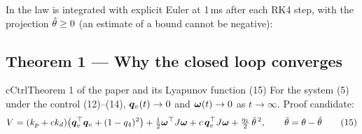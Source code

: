 \begin{projbox}
In  the law is integrated with explicit Euler at 1\,ms after each RK4 step, with the
projection $\hat{\theta}\ge0$ (an estimate of a bound cannot be negative):
\end{projbox}

\subsection{Theorem 1 --- Why the closed loop converges}
\label{sec:theorem}

\begin{eqbox}{cCtrl}{Theorem 1 of the paper and its Lyapunov function (15)}
For the system (5) under the control (12)--(14), $\bm{q}_v(t)\to0$ and $\bm{\omega}(t)\to0$ as $t\to\infty$. Proof candidate:
\begin{equation}
V=(k_p+ck_d)\big(\bm{q}_v^\top\bm{q}_v+(1-q_4)^2\big)+\tfrac12\bm{\omega}^\top J\bm{\omega}+c\,\bm{q}_v^\top J\bm{\omega}+\tfrac{\eta_1}{2}\,\tilde{\theta}^{\,2},
\qquad \tilde{\theta}=\theta-\hat{\theta} \tag{15}\label{eq:V}
\end{equation}
\end{eqbox}

